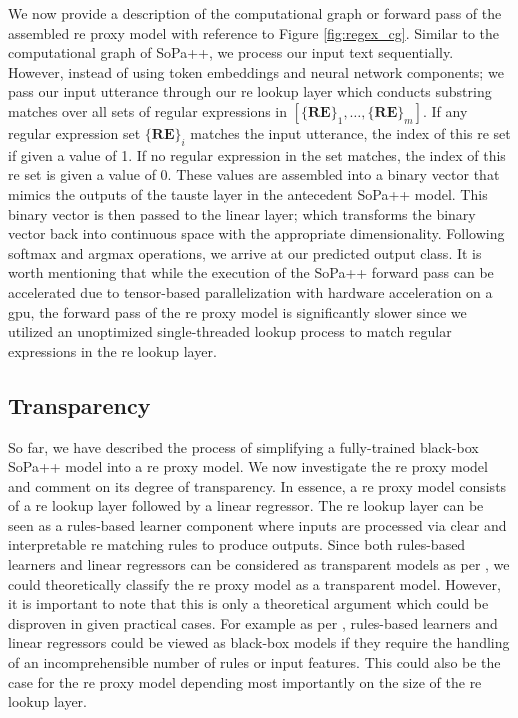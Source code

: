 We now provide a description of the computational graph or forward pass of the
assembled \ac{re} proxy model with reference to Figure \ref{fig:regex_cg}. Similar to
the computational graph of SoPa++, we process our input text sequentially.
However, instead of using token embeddings and neural network components; we
pass our input utterance through our \ac{re} lookup layer which conducts substring
matches over all sets of regular expressions in $[\{\textbf{RE}\}_1, \ldots,
\{\textbf{RE}\}_m]$. If any regular expression set $\{\textbf{RE}\}_i$ matches
the input utterance, the index of this \ac{re} set if given a value of 1. If no
regular expression in the set matches, the index of this \ac{re} set is given a value
of 0. These values are assembled into a binary vector that mimics the outputs of
the \ac{tauste} layer in the antecedent SoPa++ model. This binary vector is then
passed to the linear layer; which transforms the binary vector back
into continuous space with the appropriate dimensionality. Following softmax and
argmax operations, we arrive at our predicted output class. It is worth
mentioning that while the execution of the SoPa++ forward pass can be
accelerated due to tensor-based parallelization with hardware acceleration on a
\ac{gpu}, the forward pass of the \ac{re} proxy model is
significantly slower since we utilized an unoptimized single-threaded lookup
process to match regular expressions in the \ac{re} lookup layer.

\subsection{Transparency}

\label{section:re_transparency}

So far, we have described the process of simplifying a fully-trained black-box
SoPa++ model into a \ac{re} proxy model. We now investigate the \ac{re} proxy model and
comment on its degree of transparency. In essence, a \ac{re} proxy model consists of
a \ac{re} lookup layer followed by a linear regressor. The \ac{re} lookup layer can be
seen as a rules-based learner component where inputs are processed via clear and
interpretable \ac{re} matching rules to produce outputs. Since both rules-based
learners and linear regressors can be considered as transparent models as per
\citet[Page 7, Section 3]{arrieta2020explainable}, we could theoretically
classify the \ac{re} proxy model as a transparent model. However, it is important to
note that this is only a theoretical argument which could be disproven in given
practical cases. For example as per \citet[Page 9, Table
2]{arrieta2020explainable}, rules-based learners and linear regressors could be
viewed as black-box models if they require the handling of an incomprehensible
number of rules or input features. This could also be the case for the \ac{re} proxy
model depending most importantly on the size of the \ac{re} lookup layer.

